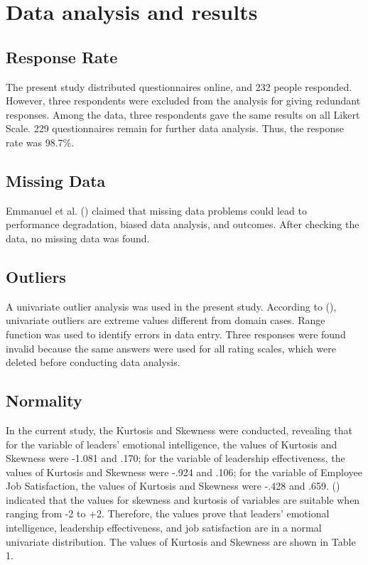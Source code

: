 \documentclass[
  man,
  longtable,
  nolmodern,
  notxfonts,
  notimes,
  colorlinks=true,linkcolor=blue,citecolor=blue,urlcolor=blue]{apa7}
\begin{document}
\section{Data analysis and results}\label{data-analysis-and-results}

\subsection{Response Rate}\label{response-rate}

The present study distributed questionnaires online, and 232 people
responded. However, three respondents were excluded from the analysis
for giving redundant responses. Among the data, three respondents gave
the same results on all Likert Scale. 229 questionnaires remain for
further data analysis. Thus, the response rate was 98.7\%.

\subsection{Missing Data}\label{missing-data}

Emmanuel et al. () claimed that missing
data problems could lead to performance degradation, biased data
analysis, and outcomes. After checking the data, no missing data was
found.

\subsection{Outliers}\label{outliers}

A univariate outlier analysis was used in the present study. According
to (), univariate
outliers are extreme values different from domain cases. Range function
was used to identify errors in data entry. Three responses were found
invalid because the same answers were used for all rating scales, which
were deleted before conducting data analysis.

\subsection{Normality}\label{normality}

In the current study, the Kurtosis and Skewness were conducted,
revealing that for the variable of leaders' emotional intelligence, the
values of Kurtosis and Skewness were -1.081 and .170; for the variable
of leadership effectiveness, the values of Kurtosis and Skewness were
-.924 and .106; for the variable of Employee Job Satisfaction, the
values of Kurtosis and Skewness were -.428 and .659.
() indicated that the
values for skewness and kurtosis of variables are suitable when ranging
from -2 to +2. Therefore, the values prove that leaders' emotional
intelligence, leadership effectiveness, and job satisfaction are in a
normal univariate distribution. The values of Kurtosis and Skewness are
shown in Table 1.
\end{document}
